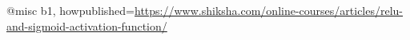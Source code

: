 @misc
{b1,
  howpublished={\url{https://www.shiksha.com/online-courses/articles/relu-and-sigmoid-activation-function/}}
}
